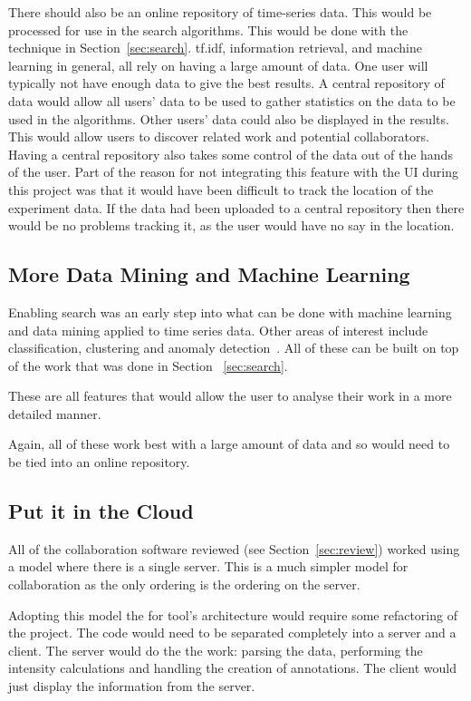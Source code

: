 There should also be an online repository of time-series data.  This would be processed for use in the search algorithms.  This would be done with the technique in Section~\ref{sec:search}.  \ac{tf.idf}, information retrieval, and machine learning in general, all rely on having a large amount of data.  One user will typically not have enough data to give the best results.  A central repository of data would allow all users' data to be used to gather statistics on the data to be used in the algorithms.  Other users' data could also be displayed in the results.  This would allow users to discover related work and potential collaborators.  Having a central repository also takes some control of the data out of the hands of the user.  Part of the reason for not integrating this feature with the \ac{UI} during this project was that it would have been difficult to track the location of the experiment data.  If the data had been uploaded to a central repository then there would be no problems tracking it, as the user would have no say in the location.

\subsection{More Data Mining and Machine Learning}

Enabling search was an early step into what can be done with machine learning and data mining applied to time series data.  Other areas of interest include classification, clustering and anomaly detection~\cite{esling, chotirat}.  All of these can be built on top of the work that was done in Section ~\ref{sec:search}.

These are all features that would allow the user to analyse their work in a more detailed manner.

Again, all of these work best with a large amount of data and so would need to be tied into an online repository.

\subsection{Put it in the Cloud}
\label{sec:cloud}
All of the collaboration software reviewed (see Section~\ref{sec:review}) worked using a model where there is a single server.  This is a much simpler model for collaboration as the only ordering is the ordering on the server.

Adopting this model the for tool's architecture would require some refactoring of the project.  The code would need to be separated completely into a server and a client.  The server would do the the work: parsing the data, performing the intensity calculations and handling the creation of annotations.  The client would just display the information from the server.

